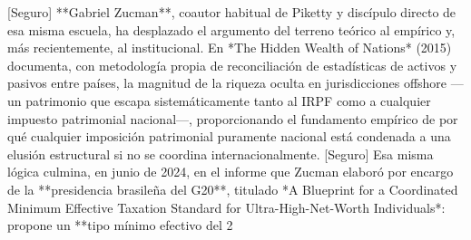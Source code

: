 \documentclass[10pt,a4paper]{article}
\begin{document}
[Seguro] **Gabriel Zucman**, coautor habitual de Piketty y discípulo directo de esa misma escuela, ha desplazado el argumento del terreno teórico al empírico y, más recientemente, al institucional. En *The Hidden Wealth of Nations* (2015) documenta, con metodología propia de reconciliación de estadísticas de activos y pasivos entre países, la magnitud de la riqueza oculta en jurisdicciones offshore —un patrimonio que escapa sistemáticamente tanto al IRPF como a cualquier impuesto patrimonial nacional—, proporcionando el fundamento empírico de por qué cualquier imposición patrimonial puramente nacional está condenada a una elusión estructural si no se coordina internacionalmente. [Seguro] Esa misma lógica culmina, en junio de 2024, en el informe que Zucman elaboró por encargo de la **presidencia brasileña del G20**, titulado *A Blueprint for a Coordinated Minimum Effective Taxation Standard for Ultra-High-Net-Worth Individuals*: propone un **tipo mínimo efectivo del 2%
\end{document}
